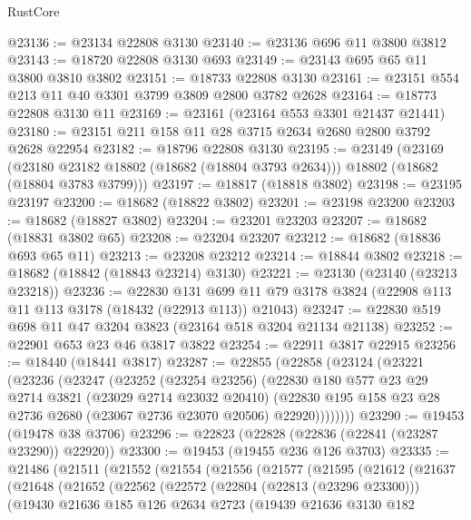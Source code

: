 \begin{lexlean}{RustCore}
\begin{coremodule}
@23136 := @23134 @22808 @3130
@23140 := @23136 @696 @11 @3800 @3812
@23143 := @18720 @22808 @3130 @693
@23149 := @23143 @695 @65 @11 @3800 @3810 @3802
@23151 := @18733 @22808 @3130
@23161 := @23151 @554 @213 @11 @40 @3301 @3799 @3809 @2800 @3782 @2628
@23164 := @18773 @22808 @3130 @11
@23169 := @23161 (@23164 @553 @3301 @21437 @21441)
@23180 := @23151 @211 @158 @11 @28 @3715 @2634 @2680 @2800 @3792 @2628 @22954
@23182 := @18796 @22808 @3130
@23195 := @23149
    (@23169
      (@23180 @23182 @18802 (@18682 (@18804 @3793 @2634)))
      @18802
      (@18682 (@18804 @3783 @3799)))
@23197 := @18817 (@18818 @3802)
@23198 := @23195 @23197
@23200 := @18682 (@18822 @3802)
@23201 := @23198 @23200
@23203 := @18682 (@18827 @3802)
@23204 := @23201 @23203
@23207 := @18682 (@18831 @3802 @65)
@23208 := @23204 @23207
@23212 := @18682 (@18836 @693 @65 @11)
@23213 := @23208 @23212
@23214 := @18844 @3802
@23218 := @18682 (@18842 (@18843 @23214) @3130)
@23221 := @23130 (@23140 (@23213 @23218))
@23236 := @22830
    @131
    @699
    @11
    @79
    @3178
    @3824
    (@22908 @113 @11 @113 @3178 (@18432 (@22913 @113)) @21043)
@23247 := @22830 @519 @698 @11 @47 @3204 @3823 (@23164 @518 @3204 @21134 @21138)
@23252 := @22901 @653 @23 @46 @3817 @3822
@23254 := @22911 @3817 @22915
@23256 := @18440 (@18441 @3817)
@23287 := @22855
    (@22858
      (@23124
        (@23221
          (@23236
            (@23247
              (@23252
                (@23254 @23256)
                (@22830
                  @180
                  @577
                  @23
                  @29
                  @2714
                  @3821
                  (@23029 @2714 @23032 @20410)
                  (@22830 @195 @158 @23 @28 @2736 @2680 (@23067 @2736 @23070 @20506) @22920))))))))
@23290 := @19453 (@19478 @38 @3706)
@23296 := @22823 (@22828 (@22836 (@22841 (@23287 @23290)) @22920))
@23300 := @19453 (@19455 @236 @126 @3703)
@23335 := @21486
    (@21511
      (@21552
        (@21554
          (@21556
            (@21577
              (@21595
                (@21612
                  (@21637
                    (@21648
                      (@21652
                        (@22562
                          (@22572
                            (@22804 (@22813 (@23296 @23300)))
                            (@19430
                              @21636
                              @185
                              @126
                              @2634
                              @2723
                              (@19439
                                @21636
                                @3130
                                @182

\end{coremodule}
\end{lexlean}
